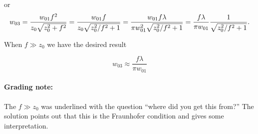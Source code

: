 {or
\begin{dmath}\label{eqn:problemSet4Problem1:280}
w_{03}
=
\frac{w_{01} f^2}{z_0 \sqrt{z_0^2 + f^2} }
=
\frac{w_{01} f}{z_0 \sqrt{z_0^2/f^2 + 1} }
=
\frac{w_{01} f \lambda}{\pi w_{01}^2 \sqrt{z_0^2/f^2 + 1} }
=
\frac{f \lambda}{\pi w_{01}} \inv{\sqrt{z_0^2/f^2 + 1} }.
\end{dmath}

When $f \gg z_0$ we have the desired result

\begin{dmath}\label{eqn:problemSet4Problem1:300}
\boxed{
w_{03}
\approx
\frac{f \lambda}{\pi w_{01}}
}
\end{dmath}

\paragraph{Grading note:} The $f \gg z_0$ was underlined with the question ``where did you get this from?''  The solution points out that this is the Fraunhofer condition and gives some interpretation.

}
